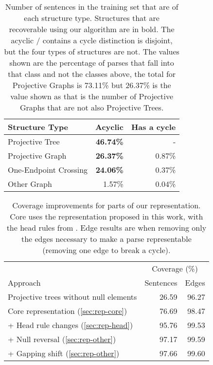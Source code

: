 \begin{table}
  \centering
  \begin{tabular}{|lrr|}
    \hline
    Structure Type & Acyclic & Has a cycle \\
    \hline
    \hline
    Projective Tree & \textbf{46.74\%} & - \\
    Projective Graph & \textbf{26.37\%} & 0.87\% \\
    One-Endpoint Crossing & \textbf{24.06\%} & 0.37\% \\
    Other Graph & 1.57\% & 0.04\% \\
    \hline
  \end{tabular}
  \caption[Number of sentences in the training set that are of each structure type.]{ \label{tab:structures}
    Number of sentences in the training set that are of each structure type.
    Structures that are recoverable using our algorithm are in bold.
    The acyclic / contains a cycle distinction is disjoint, but the four types of structures are not.
    The values shown are the percentage of parses that fall into that class and not the classes above, \myie the total for Projective Graphs is 73.11\% but 26.37\% is the value shown as that is the number of Projective Graphs that are not also Projective Trees.
  }
\end{table}

\begin{table}
\centering
  \vspace{2mm}
  \begin{tabular}{|lrr|}
    \hline
    & \multicolumn{2}{c}{Coverage (\%)} \\
    Approach & Sentences & Edges \\
    \hline
    \hline
    Projective trees without null elements & 26.59 & 96.27 \\
    \hline
    Core representation (\ref{sec:rep-core}) & 76.69 & 98.47 \\
    + Head rule changes (\ref{sec:rep-head}) & 95.76 & 99.53 \\
    + Null reversal (\ref{sec:rep-other}) & 97.17 & 99.59 \\
    + Gapping shift (\ref{sec:rep-other}) & 97.66 & 99.60 \\
    \hline
  \end{tabular}
  \caption[Coverage improvements for parts of our graph representation.]{ \label{tab:coverage}
    Coverage improvements for parts of our representation.
    Core uses the representation proposed in this work, with the head rules from \textcite{cck}.
    Edge results are when removing only the edges necessary to make a parse representable (\myeg removing one edge to break a cycle).
  }
\end{table}

